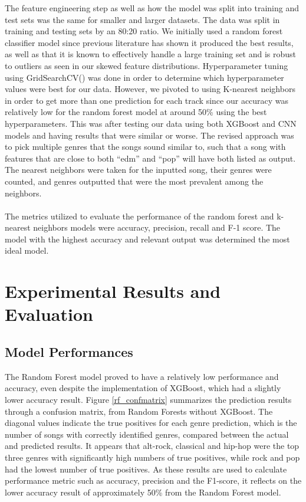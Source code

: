 \documentclass[times, twocolumn]{article}
\begin{document}
The feature engineering step as well as how the model was split into training and test sets was the same for smaller and larger datasets. The data was split in training and testing sets by an 80:20 ratio. We initially used a random forest classifier model since previous literature has shown it produced the best results, as well as that it is known to effectively handle a large training set and is robust to outliers as seen in our skewed feature distributions. Hyperparameter tuning using GridSearchCV() was done in order to determine which hyperparameter values were best for our data. However, we pivoted to using K-nearest neighbors in order to get more than one prediction for each track since our accuracy was relatively low for the random forest model at around 50\% using the best hyperparameters. This was after testing our data using both XGBoost and CNN models and having results that were similar or worse. The revised approach was to pick multiple genres that the songs sound similar to, such that a song with features that are close to both “edm” and “pop” will have both listed as output. The nearest neighbors were taken for the inputted song, their genres were counted, and genres outputted that were the most prevalent among the neighbors.\\\\
The metrics utilized to evaluate the performance of the random forest and k-nearest neighbors models were accuracy, precision, recall and F-1 score. The model with the highest accuracy and relevant output was determined the most ideal model.

\section{Experimental Results and Evaluation}
\subsection{Model Performances}
The Random Forest model proved to have a relatively low performance and accuracy, even despite the implementation of XGBoost, which had a slightly lower accuracy result. Figure \ref{rf_confmatrix} summarizes the prediction results through a confusion matrix, from Random Forests without XGBoost. The  diagonal values indicate the true positives for each genre prediction, which is the number of songs with correctly identified genres, compared between the actual and predicted results. It appears that alt-rock, classical and hip-hop were the top three genres with significantly high numbers of true positives, while rock and pop had the lowest number of true positives. As these results are used to calculate performance metric such as accuracy, precision and the F1-score, it reflects on the lower accuracy result of approximately 50\% from the Random Forest model.
\end{document}
